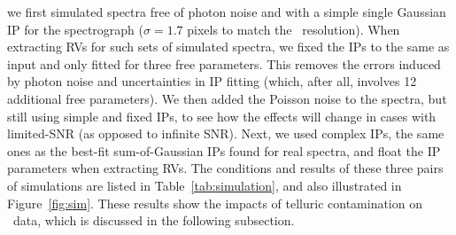 we first simulated spectra free of photon noise and with a simple
single Gaussian IP for the spectrograph ($\sigma = 1.7$ pixels to
match the \keck\ resolution). When extracting RVs for such sets of
simulated spectra, we fixed the IPs to the same as input and only
fitted for three free parameters. This removes the errors induced by
photon noise and uncertainties in IP fitting (which, after all,
involves 12 additional free parameters). We then added the Poisson
noise to the spectra, but still using simple and fixed IPs, to see how
the effects will change in cases with limited-SNR (as opposed to
infinite SNR). Next, we used complex IPs, the same ones as the
best-fit sum-of-Gaussian IPs found for real spectra, and float the IP
parameters when extracting RVs.  The conditions and
results of these three pairs of simulations are listed in
Table~\ref{tab:simulation}, and also illustrated in
Figure~\ref{fig:sim}. These results show the impacts of
telluric contamination on \keck\ data, which is discussed in the
following subsection.


